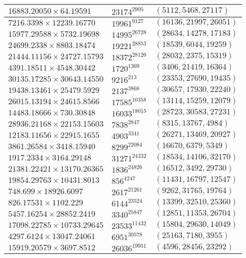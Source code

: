 \begin{longtable}{|l|l|l|}
$16883.20050 \times 64.19591$ & $23174^{2905}$ & $(5112,5468,27117)$ \\ \hline
$7216.3398 \times 12239.16770$ & $19961^{9127}$ & $(16136,21997,26051)$ \\ \hline
$15977.29588 \times 5732.19698$ & $14995^{26728}$ & $(28634,14278,17183)$ \\ \hline
$24699.2338 \times 8803.18474$ & $19221^{28853}$ & $(18539,6044,19259)$ \\ \hline
$21444.11156 \times 24727.15793$ & $18372^{28126}$ & $(28032,2375,15319)$ \\ \hline
$4391.18511 \times 4548.30442$ & $1720^{1369}$ & $(3406,21419,16364)$ \\ \hline
$30135.17285 \times 30643.14550$ & $9216^{213}$ & $(23353,27690,19435)$ \\ \hline
$19438.13461 \times 25479.5929$ & $2137^{3868}$ & $(30657,17930,22240)$ \\ \hline
$26015.13194 \times 24615.8566$ & $17585^{10358}$ & $(13114,15259,12079)$ \\ \hline
$14483.18666 \times 730.30848$ & $16033^{18015}$ & $(28723,30583,27231)$ \\ \hline
$28936.21168 \times 22153.15603$ & $7838^{2847}$ & $(8315,13767,4984)$ \\ \hline$12183.11656 \times 22915.1655$ & $4903^{3341}$ & $(26271,13469,20927)$ \\ \hline
$3861.26584 \times 3418.15940$ & $8299^{22084}$ & $(16670,6379,5349)$ \\ \hline
$1917.2334 \times 3164.29148$ & $31271^{24332}$ & $(18534,14106,32170)$ \\ \hline
$21381.22421 \times 13170.26365$ & $1836^{24826}$ & $(16512,3492,29730)$ \\ \hline
$19854.29763 \times 10431.8013$ & $856^{4247}$ & $(11431,16797,12547)$ \\ \hline$748.699 \times 18926.6097$ & $2617^{21261}$ & $(9262,31765,19764)$ \\ \hline
$826.17531 \times 1102.229$ & $6144^{23524}$ & $(13399,32510,25360)$ \\ \hline
$5457.16254 \times 28852.2419$ & $3340^{25847}$ & $(12851,11353,26704)$ \\ \hline
$17098.22785 \times 10733.29645$ & $23533^{11432}$ & $(15804,29630,14049)$ \\ \hline
$4297.6124 \times 13047.24061$ & $6951^{30578}$ & $(25163,7180,3955)$ \\ \hline
$15919.20579 \times 3697.8512$ & $26036^{19951}$ & $(4596,28456,23292)$ \\ \hline

\end{longtable}
